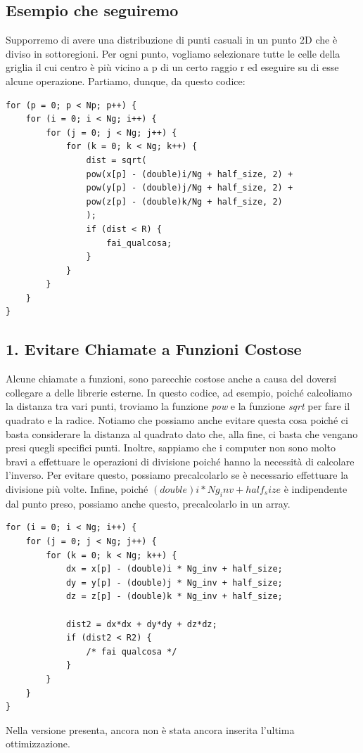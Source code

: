 \subsection{Esempio che seguiremo}
Supporremo di avere una distribuzione di punti casuali in un punto 2D che è diviso in sottoregioni. Per ogni punto, vogliamo selezionare tutte le celle della griglia il cui centro è più vicino a p di un certo raggio r ed eseguire su di esse alcune operazione.
Partiamo, dunque, da questo codice:
\begin{framed}
\begin{minipage}{\textwidth}
\footnotesize %
\begin{verbatim}
for (p = 0; p < Np; p++) {
    for (i = 0; i < Ng; i++) {
        for (j = 0; j < Ng; j++) {
            for (k = 0; k < Ng; k++) {
                dist = sqrt(
                pow(x[p] - (double)i/Ng + half_size, 2) +
                pow(y[p] - (double)j/Ng + half_size, 2) +
                pow(z[p] - (double)k/Ng + half_size, 2)
                );
                if (dist < R) {
                    fai_qualcosa;
                }
            }
        }
    }
}
\end{verbatim}
\end{minipage}
\end{framed}

\subsection{1. Evitare Chiamate a Funzioni Costose}
Alcune chiamate a funzioni, sono parecchie costose anche a causa del doversi collegare a delle librerie esterne. In questo codice, ad esempio, poiché calcoliamo la distanza tra vari punti, troviamo la funzione \textit{pow} e la funzione \textit{sqrt} per fare il quadrato e la radice. 
Notiamo che possiamo anche evitare questa cosa poiché ci basta considerare la distanza al quadrato dato che, alla fine, ci basta che vengano presi quegli specifici punti. Inoltre, sappiamo che i computer non sono molto bravi a effettuare le operazioni di divisione poiché hanno la necessità di calcolare l'inverso. Per evitare questo, possiamo precalcolarlo se è necessario effettuare la divisione più volte.
Infine, poiché $(double)i * Ng_inv + half_size$ è indipendente dal punto preso, possiamo anche questo, precalcolarlo in un array.
\begin{framed}
\noindent
\footnotesize
\begin{verbatim}
for (i = 0; i < Ng; i++) {
    for (j = 0; j < Ng; j++) {
        for (k = 0; k < Ng; k++) {
            dx = x[p] - (double)i * Ng_inv + half_size; 
            dy = y[p] - (double)j * Ng_inv + half_size; 
            dz = z[p] - (double)k * Ng_inv + half_size;
            
            dist2 = dx*dx + dy*dy + dz*dz;
            if (dist2 < R2) {
                /* fai qualcosa */ 
            }
        }
    }
}
\end{verbatim}
\vspace{0.3cm}
\end{framed}
Nella versione presenta, ancora non è stata ancora inserita l'ultima ottimizzazione.
